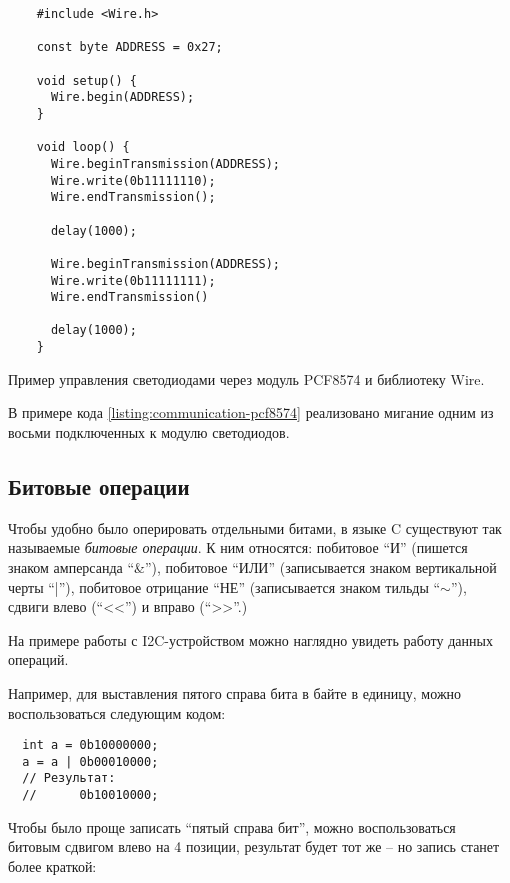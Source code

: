 \documentclass[../sparc.tex]{subfiles}
\begin{document}
\begin{listing}[H]
  \begin{verbatim}
    #include <Wire.h>

    const byte ADDRESS = 0x27;

    void setup() {
      Wire.begin(ADDRESS);
    }

    void loop() {
      Wire.beginTransmission(ADDRESS);
      Wire.write(0b11111110);
      Wire.endTransmission();

      delay(1000);

      Wire.beginTransmission(ADDRESS);
      Wire.write(0b11111111);
      Wire.endTransmission()

      delay(1000);
    }
  \end{verbatim}
  \label{listing:communication-pcf8574}
  \caption{Пример управления светодиодами через модуль PCF8574 и библиотеку
    Wire.}
\end{listing}

В примере кода \ref{listing:communication-pcf8574} реализовано мигание одним из
восьми подключенных к модулю светодиодов.

\subsection{Битовые операции}

Чтобы удобно было оперировать отдельными битами, в языке C существуют так
называемые \emph{битовые операции}.  К ним относятся: побитовое ``И'' (пишется
знаком амперсанда ``\&''), побитовое ``ИЛИ'' (записывается знаком вертикальной
черты ``|''), побитовое отрицание ``НЕ'' (записывается знаком тильды ``$\sim$''),
сдвиги влево (``<<'') и вправо (``>>''.)

На примере работы с I2C-устройством можно наглядно увидеть работу данных
операций.

Например, для выставления пятого справа бита в байте в единицу, можно
воспользоваться следующим кодом:

\begin{verbatim}
  int a = 0b10000000;
  a = a | 0b00010000;
  // Результат:
  //      0b10010000;
\end{verbatim}

Чтобы было проще записать ``пятый справа бит'', можно воспользоваться битовым
сдвигом влево на 4 позиции, результат будет тот же -- но запись станет более
краткой:
\end{document}
